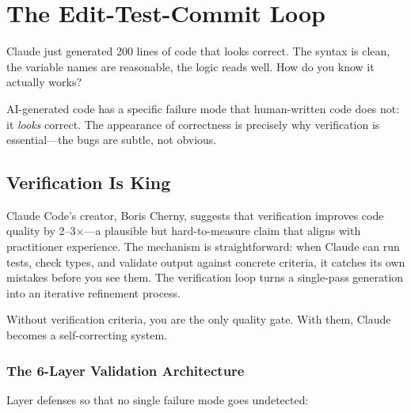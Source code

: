 \chapter{The Edit-Test-Commit Loop}
\label{ch:testing}

\begin{itshape}
Claude just generated 200 lines of code that looks correct.
The syntax is clean, the variable names are reasonable, the logic reads well.
How do you know it actually works?
\end{itshape}

AI-generated code has a specific failure mode that human-written code does not:
it \emph{looks} correct. The appearance of correctness is precisely
why verification is essential---the bugs are subtle, not obvious.

\section{Verification Is King}
\label{sec:verification}


\begin{whybox}
Claude Code's creator, Boris Cherny, suggests that verification improves
code quality by 2--3$\times$---a plausible but hard-to-measure claim
that aligns with practitioner experience. The mechanism is straightforward:
when Claude can run tests, check types, and validate output against
concrete criteria, it catches its own mistakes before you see them.
The verification loop turns a single-pass generation into an iterative
refinement process.

Without verification criteria, you are the only quality gate.
With them, Claude becomes a self-correcting system.
\end{whybox}

\subsection{The 6-Layer Validation Architecture}

Layer defenses so that no single failure mode goes undetected:

